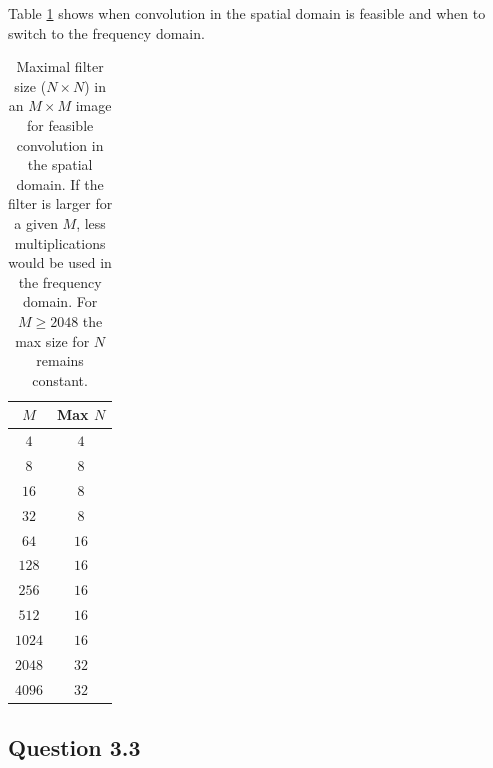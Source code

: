 \documentclass[a4paper, 10pt, final]{article}
\begin{document}
Table \ref{table_sizes} shows when convolution in the spatial domain is
feasible and when to switch to the frequency domain.
\begin{table}[!h]
    \centering
    \begin{tabular}{|c|c|}
        \hline
        $M$ & Max $N$\\\hline
        $4$ & $4$ \\
        $8$ & $8$\\
        $16$ & $8$\\
        $32$ & $8$\\
        $64$ & $16$\\
        $128$ & $16$\\
        $256$ & $16$\\
        $512$ & $16$\\
        $1024$ & $16$\\
        $2048$ & $32$\\
        $4096$ & $32$\\
        \hline
    \end{tabular}
    \caption{Maximal filter size ($N \times N$) in
    an $M \times M$ image for feasible convolution in
    the spatial domain. If the filter is larger for a given $M$, less
    multiplications would be used in the frequency domain. For
    $M \geq 2048$ the max size for $N$ remains constant.}
    \label{table_sizes}
\end{table}

\subsection*{Question 3.3}





\end{document}
